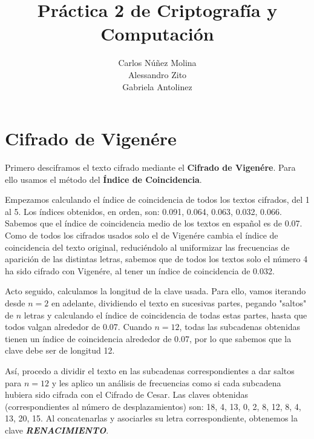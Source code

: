 \documentclass{article}
\title{Práctica 2 de Criptografía y Computación}
\date{}
\author{Carlos Núñez Molina \\ Alessandro Zito \\ Gabriela Antolinez}
\begin{document}
	\maketitle
	\newpage	
	
	\section{Cifrado de Vigenére}
	Primero desciframos el texto cifrado mediante el \textbf{Cifrado de Vigenére}. Para ello usamos el método del \textbf{Índice de Coincidencia}.
	
	Empezamos calculando el índice de coincidencia de todos los textos cifrados, del 1 al 5. Los índices obtenidos, en orden, son: 0.091, 0.064, 0.063, 0.032, 0.066. Sabemos que el índice de coincidencia medio de los textos en español es de 0.07. Como de todos los cifrados usados solo el de Vigenére cambia el índice de coincidencia del texto original, reduciéndolo al uniformizar las frecuencias de aparición de las distintas letras, sabemos que de todos los textos solo el número 4 ha sido cifrado con Vigenére, al tener un índice de coincidencia de 0.032.
	
	Acto seguido, calculamos la longitud de la clave usada. Para ello, vamos iterando desde $n=2$ en adelante, dividiendo el texto en sucesivas partes, pegando "saltos" de $n$ letras y calculando el índice de coincidencia de todas estas partes, hasta que todos valgan alrededor de 0.07. Cuando $n=12$, todas las subcadenas obtenidas tienen un índice de coincidencia alrededor de 0.07, por lo que sabemos que la clave debe ser de longitud 12.
	
	Así, procedo a dividir el texto en las subcadenas correspondientes a dar saltos para $n=12$ y les aplico un análisis de frecuencias como si cada subcadena hubiera sido cifrada con el Cifrado de Cesar. Las claves obtenidas (correspondientes al número de desplazamientos) son: 18, 4, 13, 0, 2, 8, 12, 8, 4, 13, 20, 15. Al concatenarlas y asociarles su letra correspondiente, obtenemos la clave \textbf{\emph{RENACIMIENTO}}.
	
\end{document}
